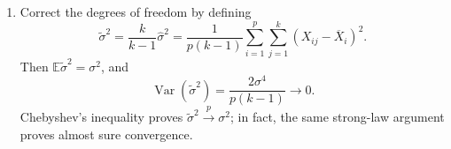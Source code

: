 \documentclass[lang=en,11pt,a4paper,citestyle=authoryear]{elegantpaper}
\newcommand{\E}{\mathbb{E}}
\begin{document}
\begin{enumerate}[label=(\alph*),leftmargin=*]
\item Correct the degrees of freedom by defining
\[
{\widetilde\sigma^2
=\frac{k}{k-1}\widehat\sigma^2
=\frac1{p(k-1)}\sum_{i=1}^p\sum_{j=1}^k
(X_{ij}-\overline X_i)^2.}
\]
Then $\E\widetilde\sigma^2=\sigma^2$, and
\[
\operatorname{Var}(\widetilde\sigma^2)
=\frac{2\sigma^4}{p(k-1)}\longrightarrow0.
\]
Chebyshev's inequality proves
$\widetilde\sigma^2\xrightarrow p\sigma^2$; in fact, the same
strong-law argument proves almost sure convergence.
\end{enumerate}
\vspace{2em}
\end{document}
